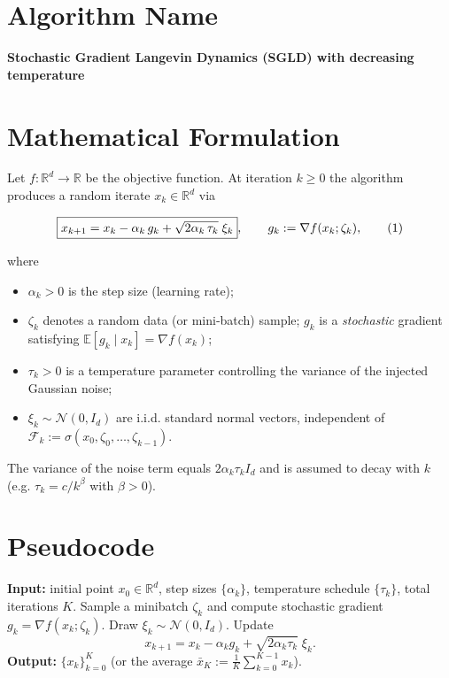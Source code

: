 \documentclass{article}
\newcommand{\EE}{\mathbb{E}}
\newcommand{\RR}{\mathbb{R}}
\begin{document}
\section*{Algorithm Name}
\textbf{Stochastic Gradient Langevin Dynamics (SGLD) with decreasing temperature}

\section*{Mathematical Formulation}
Let $f:\RR^{d}\to\RR$ be the objective function.  
At iteration $k\ge 0$ the algorithm produces a random iterate $x_{k}\in\RR^{d}$ via  

\[
\boxed{%
x_{k+1}=x_{k}-\alpha_{k}\,g_{k}+\sqrt{2\alpha_{k}\,\tau_{k}}\;\xi_{k}},\qquad 
g_{k}:=\nabla f(x_{k};\zeta_{k}),
\tag{1}
\]

where  

\begin{itemize}[noitemsep,topsep=0pt]
\item $\alpha_{k}>0$ is the step size (learning rate);
\item $\zeta_{k}$ denotes a random data (or mini‑batch) sample; $g_{k}$ is a \emph{stochastic} gradient satisfying $\EE[g_{k}\mid x_{k}]=\nabla f(x_{k})$;
\item $\tau_{k}>0$ is a temperature parameter controlling the variance of the injected Gaussian noise;
\item $\xi_{k}\sim\mathcal N(0,I_{d})$ are i.i.d. standard normal vectors, independent of $\mathcal F_{k}:=\sigma(x_{0},\zeta_{0},\dots ,\zeta_{k-1})$.
\end{itemize}
The variance of the noise term equals $2\alpha_{k}\tau_{k}I_{d}$ and is assumed to decay with $k$ (e.g. $\tau_{k}=c/k^{\beta}$ with $\beta>0$).

\section*{Pseudocode}
\begin{algorithm}[H]
\caption{SGLD with decreasing temperature}
\begin{algorithmic}[1]
\STATE \textbf{Input:} initial point $x_{0}\in\RR^{d}$, step sizes $\{\alpha_{k}\}$, temperature schedule $\{\tau_{k}\}$, total iterations $K$.
    \STATE Sample a minibatch $\zeta_{k}$ and compute stochastic gradient $g_{k}= \nabla f(x_{k};\zeta_{k})$.
    \STATE Draw $\xi_{k}\sim\mathcal N(0,I_{d})$.
    \STATE Update 
    \[
    x_{k+1}=x_{k}-\alpha_{k}g_{k}+\sqrt{2\alpha_{k}\tau_{k}}\;\xi_{k}.
    \]
\ENDFOR
\STATE \textbf{Output:} $\{x_{k}\}_{k=0}^{K}$ (or the average $\bar x_{K}:=\frac1K\sum_{k=0}^{K-1}x_{k}$).
\end{algorithmic}
\end{algorithm}
\end{document}
